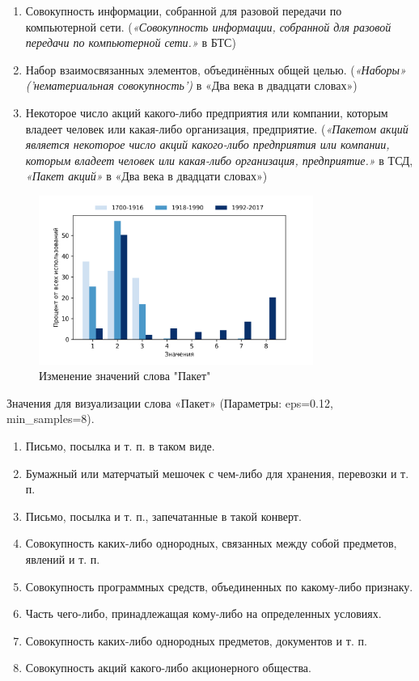 \begin{enumerate}
    \item Совокупность информации, собранной для разовой передачи по компьютерной сети.
(\textit{«Совокупность информации, собранной для разовой передачи по компьютерной сети.»} в БТС)

    \item Набор взаимосвязанных элементов, объединённых общей целью.
(\textit{«Наборы» ('нематериальная совокупность')} в «Два века в двадцати словах»)

    \item Некоторое число акций какого-либо предприятия или компании, которым владеет человек или какая-либо организация, предприятие.
(\textit{«Пакетом акций является некоторое число акций какого-либо предприятия или компании, которым владеет человек или какая-либо организация, предприятие.»} в ТСД,
\textit{«Пакет акций»} в «Два века в двадцати словах»)
\end{enumerate}

\begin{figure}[H]
	\centering
	\includegraphics[width=0.8\textwidth]{img/visualizations/paket_minimal}
	\caption{Изменение значений слова "Пакет"}
	\label{fig:Пакет}
\end{figure}

Значения для визуализации слова «Пакет» (Параметры: eps=0.12, min\_samples=8).

\begin{enumerate}
    \item Письмо, посылка и т. п. в таком виде.
    \item Бумажный или матерчатый мешочек с чем-либо для хранения, перевозки и т. п.
    \item Письмо, посылка и т. п., запечатанные в такой конверт.
    \item Совокупность каких-либо однородных, связанных между собой предметов, явлений и т. п.
    \item Совокупность программных средств, объединенных по какому-либо признаку.
    \item Часть чего-либо, принадлежащая кому-либо на определенных условиях.
    \item Совокупность каких-либо однородных предметов, документов и т. п.
    \item Совокупность акций какого-либо акционерного общества.
\end{enumerate}

